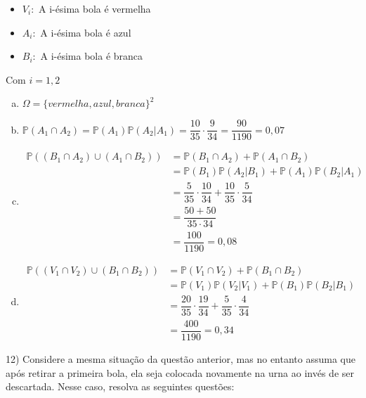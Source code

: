 \documentclass{article}
\begin{document}
\begin{itemize}
    \item $V_i:$ A i-ésima bola é vermelha
    \item $A_i:$ A i-ésima bola é azul
    \item $B_i:$ A i-ésima bola é branca
\end{itemize}

Com $i=1,2$
\begin{enumerate}[a)] %
    \item $\Omega =\{vermelha, azul, branca\}^2$ 
    \item $\mathds{P}(A_1 \cap A_2) = \mathds{P}(A_1) \mathds{P}(A_2|A_1)= \dfrac{10}{35} \cdot \dfrac{9}{34} = \dfrac{90}{1190} = 0,07$
    \item 
    \begin{align*}
        \mathds{P}((B_1 \cap A_2) \cup (A_1 \cap B_2))  &= \mathds{P}(B_1 \cap A_2) + \mathds{P}(A_1 \cap B_2) \\
        &= \mathds{P}(B_1)\mathds{P}(A_2 | B_1) + \mathds{P}(A_1)\mathds{P}(B_2 | A_1)\\
        &= \dfrac{5}{35} \cdot \dfrac{10}{34} + \dfrac{10}{35} \cdot \dfrac{5}{34}\\
        &= \dfrac{50 + 50}{35 \cdot 34} \\
        &= \dfrac{100}{1190} = 0,08
    \end{align*}

    \item \begin{align*}
        \mathds{P}((V_1 \cap V_2) \cup (B_1 \cap B_2)) &= \mathds{P}(V_1 \cap V_2) + \mathds{P}(B_1 \cap B_2)\\
        &=\mathds{P}(V_1) \mathds{P}(V_2 | V_1) + \mathds{P}(B_1) \mathds{P}(B_2 | B_1)\\
        &=\dfrac{20}{35} \cdot  \dfrac{19}{34} + \dfrac{5}{35} \cdot  \dfrac{4}{34}\\
        &=\dfrac{400}{1190} = 0,34
    \end{align*}
\end{enumerate}

12) Considere a mesma situação da questão anterior, mas no entanto assuma que após retirar a primeira bola, ela seja colocada novamente na urna ao invés de ser descartada. Nesse caso, resolva as seguintes questões:
\end{document}
